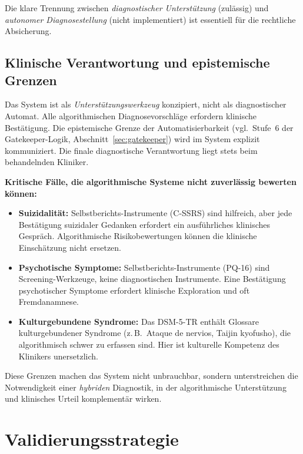 \documentclass[11pt,a4paper]{article}
\begin{document}
Die klare Trennung zwischen \textit{diagnostischer Unterst\"utzung} (zul\"assig) und \textit{autonomer Diagnosestellung} (nicht implementiert) ist essentiell f\"ur die rechtliche Absicherung.

\subsection{Klinische Verantwortung und epistemische Grenzen}

Das System ist als \textit{Unterst\"utzungswerkzeug} konzipiert, nicht als diagnostischer Automat. Alle algorithmischen Diagnosevorschl\"age erfordern klinische Best\"atigung. Die epistemische Grenze der Automatisierbarkeit (vgl.\ Stufe~6 der Gatekeeper-Logik, Abschnitt~\ref{sec:gatekeeper}) wird im System explizit kommuniziert. Die finale diagnostische Verantwortung liegt stets beim behandelnden Kliniker.

\textbf{Kritische F\"alle, die algorithmische Systeme nicht zuverl\"assig bewerten k\"onnen:}
\begin{itemize}[noitemsep]
\item \textbf{Suizidalit\"at:} Selbstberichts-Instrumente (C-SSRS) sind hilfreich, aber jede Best\"atigung suizidaler Gedanken erfordert ein ausf\"uhrliches klinisches Gespr\"ach. Algorithmische Risikobewertungen k\"onnen die klinische Einsch\"atzung nicht ersetzen.
\item \textbf{Psychotische Symptome:} Selbstberichts-Instrumente (PQ-16) sind Screening-Werkzeuge, keine diagnostischen Instrumente. Eine Best\"atigung psychotischer Symptome erfordert klinische Exploration und oft Fremdanamnese.
\item \textbf{Kulturgebundene Syndrome:} Das DSM-5-TR enth\"alt Glossare kulturgebundener Syndrome (z.\,B.\ Ataque de nervios, Taijin kyofusho), die algorithmisch schwer zu erfassen sind. Hier ist kulturelle Kompetenz des Klinikers unersetzlich.
\end{itemize}

Diese Grenzen machen das System nicht unbrauchbar, sondern unterstreichen die Notwendigkeit einer \textit{hybriden} Diagnostik, in der algorithmische Unterst\"utzung und klinisches Urteil komplement\"ar wirken.


\section{Validierungsstrategie}
\label{sec:validierung}
\end{document}
